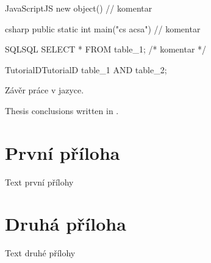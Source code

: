 \documentclass[12pt]{article}
\begin{document}
\begin{upcode}{JavaScript}{}{JS}
new object() // komentar
\end{upcode}

\begin{upcode}{csharp}{}{\csharp}
public static int main("cs acsa") // komentar
\end{upcode}

\begin{upcode}{SQL}{}{SQL}
SELECT * FROM table_1; /* komentar */
\end{upcode}

\begin{upcode}{TutorialD}{}{TutorialD}
table_1 AND table_2;
\end{upcode}

\upendofmainmatter

\begin{upconclusions}[czech]
Závěr práce v  jazyce.
\end{upconclusions}

\begin{upconclusions}[english]
Thesis conclusions written in .
\end{upconclusions}

\appendix
\section{První příloha}
Text první přílohy

\section{Druhá příloha}
Text druhé přílohy

\printglossary

\nocite{*}							%
\printbibliography

%

\printindex
\end{document}
